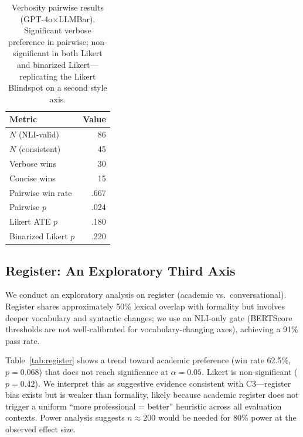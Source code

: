 \documentclass[11pt]{article}
\begin{document}
\begin{table}[t]
\centering
\small
\begin{tabular}{lr}
\toprule
\textbf{Metric} & \textbf{Value} \\
\midrule
$N$ (NLI-valid) & 86 \\
$N$ (consistent) & 45 \\
Verbose wins & 30 \\
Concise wins & 15 \\
Pairwise win rate & .667 \\
Pairwise $p$ & .024 \\
Likert ATE $p$ & .180 \\
Binarized Likert $p$ & .220 \\
\bottomrule
\end{tabular}
\caption{Verbosity pairwise results (GPT-4o$\times$LLMBar). Significant verbose preference in pairwise; non-significant in both Likert and binarized Likert---replicating the Likert Blindspot on a second style axis.}
\label{tab:verbosity}
\end{table}

\subsection{Register: An Exploratory Third Axis}
\label{sec:register}

We conduct an exploratory analysis on register (academic vs.\ conversational).
Register shares approximately 50\% lexical overlap with formality but involves deeper vocabulary and syntactic changes; we use an NLI-only gate (BERTScore thresholds are not well-calibrated for vocabulary-changing axes), achieving a 91\% pass rate.

Table~\ref{tab:register} shows a trend toward academic preference (win rate 62.5\%, $p = 0.068$) that does not reach significance at $\alpha = 0.05$.
Likert is non-significant ($p = 0.42$).
We interpret this as suggestive evidence consistent with C3---register bias exists but is weaker than formality, likely because academic register does not trigger a uniform ``more professional = better'' heuristic across all evaluation contexts.
Power analysis suggests $n \approx 200$ would be needed for 80\% power at the observed effect size.
\end{document}
